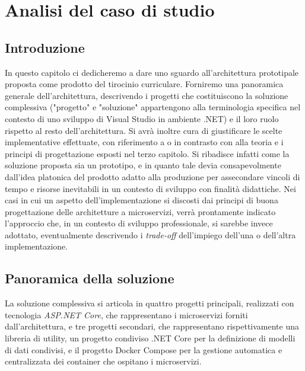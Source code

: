 \chapter{Analisi del caso di studio}
\section{Introduzione}
In questo capitolo ci dedicheremo a dare uno sguardo all'architettura prototipale proposta come prodotto del tirocinio curriculare. Forniremo una panoramica generale dell'architettura, descrivendo i progetti che costituiscono la soluzione complessiva ("progetto" e "soluzione" appartengono alla terminologia specifica nel contesto di uno sviluppo di Visual Studio in ambiente .NET) e il loro ruolo rispetto al resto dell'architettura. Si avrà inoltre cura di giustificare le scelte implementative effettuate, con riferimento a o in contrasto con alla teoria e i principi di progettazione esposti nel terzo capitolo. Si ribadisce infatti come la soluzione proposta sia un prototipo, e in quanto tale devia consapevolmente dall'idea platonica del prodotto adatto alla produzione per assecondare vincoli di tempo e risorse inevitabili in un contesto di sviluppo con finalità didattiche. Nei casi in cui un aspetto dell'implementazione si discosti dai principi di buona progettazione delle architetture a microservizi, verrà prontamente indicato l'approccio che, in un contesto di sviluppo professionale, si sarebbe invece adottato, eventualmente descrivendo i \emph{trade-off} dell'impiego dell'una o dell'altra implementazione.

\section{Panoramica della soluzione}
La soluzione complessiva si articola in quattro progetti principali, realizzati con tecnologia \emph{ASP.NET Core}, che rappresentano i microservizi forniti dall'architettura, e tre progetti secondari, che rappresentano rispettivamente una libreria di utility, un progetto condiviso .NET Core per la definizione di modelli di dati condivisi, e il progetto Docker Compose per la gestione automatica e centralizzata dei container che ospitano i microservizi.

